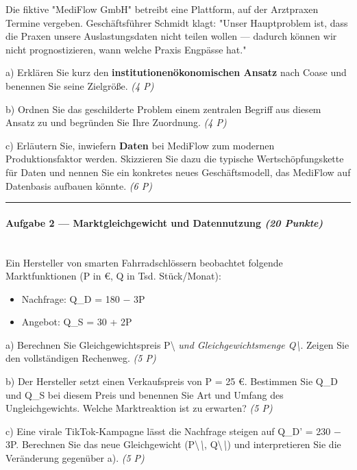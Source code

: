 \documentclass[11pt, a4paper]{article}
\begin{document}
Die fiktive "MediFlow GmbH" betreibt eine Plattform, auf der Arztpraxen Termine vergeben. Geschäftsführer Schmidt klagt: "Unser Hauptproblem ist, dass die Praxen unsere Auslastungsdaten nicht teilen wollen — dadurch können wir nicht prognostizieren, wann welche Praxis Engpässe hat."


a) Erklären Sie kurz den \textbf{institutionenökonomischen Ansatz} nach Coase und benennen Sie seine Zielgröße. \textit{(4 P)}


b) Ordnen Sie das geschilderte Problem einem zentralen Begriff aus diesem Ansatz zu und begründen Sie Ihre Zuordnung. \textit{(4 P)}


c) Erläutern Sie, inwiefern \textbf{Daten} bei MediFlow zum modernen Produktionsfaktor werden. Skizzieren Sie dazu die typische Wertschöpfungskette für Daten und nennen Sie ein konkretes neues Geschäftsmodell, das MediFlow auf Datenbasis aufbauen könnte. \textit{(6 P)}



\noindent\textcolor{rulegray}{\rule{\linewidth}{0.4pt}}


\paragraph{Aufgabe 2 — Marktgleichgewicht und Datennutzung \textit{(20 Punkte)}}\mbox{}\\[2pt]

Ein Hersteller von smarten Fahrradschlössern beobachtet folgende Marktfunktionen (P in €, Q in Tsd. Stück/Monat):


\begin{itemize}
  \item Nachfrage: Q\_D = 180 − 3P
  \item Angebot: Q\_S = 30 + 2P
\end{itemize}

a) Berechnen Sie Gleichgewichtspreis P\textbackslash{}\textit{ und Gleichgewichtsmenge Q\textbackslash{}}. Zeigen Sie den vollständigen Rechenweg. \textit{(5 P)}


b) Der Hersteller setzt einen Verkaufspreis von P = 25 €. Bestimmen Sie Q\_D und Q\_S bei diesem Preis und benennen Sie Art und Umfang des Ungleichgewichts. Welche Marktreaktion ist zu erwarten? \textit{(5 P)}


c) Eine virale TikTok-Kampagne lässt die Nachfrage steigen auf Q\_D' = 230 − 3P. Berechnen Sie das neue Gleichgewicht (P\textbackslash{}\textit{\textbackslash{}}, Q\textbackslash{}\textit{\textbackslash{}}) und interpretieren Sie die Veränderung gegenüber a). \textit{(5 P)}
\end{document}
